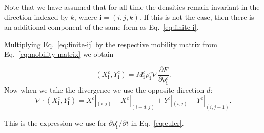 \documentclass[journal=langd5,manuscript=article]{achemso}
\def\i{\mathbf{i}}
\begin{document}
Note that we have assumed that for all time the densities remain invariant
in the direction indexed by $k$, where $\i=(i,j,k)$. If this is not the
case, then there is an additional component of the same form as
Eq.~\eqref{eq:finite-i}.

Multiplying Eq.~\eqref{eq:finite-ij} by the respective mobility matrix
from Eq.~\eqref{eq:mobility-matrix} we obtain

\begin{equation}
  (X^c_\i,Y^c_\i) =
  M^c_\i\rho^c_\i\nabla \frac{\partial F}{\partial \rho^c_\i}.
\end{equation}
%
Now when we take the divergence we use the opposite direction $d$:
%
\begin{equation}
\nabla \cdot (X^c_\i,Y^c_\i) =
  X^c|_{(i,j)} - X^c|_{(i-d,j)} +
  Y^c|_{(i,j)} - Y^c|_{(i,j-1)}.
\end{equation}

This is the expression we use for $\partial\rho^c_\i / \partial t$ in
Eq.~\eqref{eq:euler}.
\end{document}
